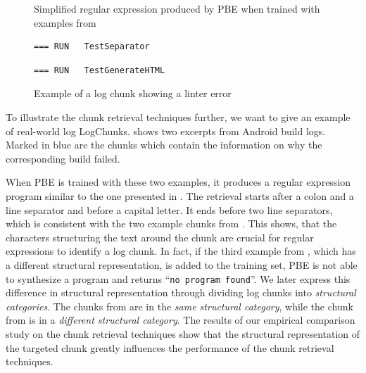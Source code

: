 \begin{figure}[!htbp]
  \centering
  
  \caption{Simplified regular expression produced by PBE when trained
  with examples from }
  \label{lst:prose-program-simplified}
\end{figure}

\begin{figure}[!htbp]
  \centering
  \begin{lstlisting}[breaklines=true,frame=tlr]
=== RUN   TestSeparator
  \end{lstlisting}
  \vspace{-\baselineskip}
  
  \vspace{-\baselineskip}
  \begin{lstlisting}[breaklines=true,frame=blr]
=== RUN   TestGenerateHTML
  \end{lstlisting}
  \caption{Example of a log chunk showing a linter error}
  \label{lst:chunk-example-3}
\end{figure}

To illustrate the chunk retrieval techniques further, we want to give
an example of real-world log LogChunks.
 shows two excerpts
from Android build logs.
Marked in blue are the chunks
which contain the information on why the
corresponding build failed.

When PBE is trained with these two examples, it produces
a regular expression program similar to the one presented in
.
The retrieval
starts after a colon and a line separator and before a capital
letter.
It ends before two line separators,
which is consistent with the two example
chunks from .
This shows, that the characters structuring the text around the chunk are
crucial for regular expressions to identify a log chunk.
In fact, if the third example from ,
which has a
different structural representation, is added to the training set,
PBE is not able to synthesize a program and returns
``\texttt{no program found}''.
We later express this difference in structural representation through
dividing log chunks into \emph{structural categories}.
The chunks from 
are in the \emph{same structural category}, while the chunk from
 is in a
\emph{different structural category}.
The results of our empirical comparison study on the chunk retrieval
techniques
show that the structural representation of the targeted chunk greatly
influences
the performance of the chunk retrieval techniques.

